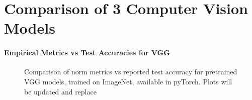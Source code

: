 \section{Comparison of 3 Computer Vision Models}
\label{sxn:cv}

\paragraph{Empirical Metrics vs Test Accuracies for VGG}

\begin{figure}[t]
    \centering
    \qquad
    \qquad
    \qquad
    \caption{Comparison of norm metrics vs reported test accuracy for pretrained VGG models, trained on ImageNet, available in pyTorch.  Plots will be updated and replace }
    

    \label{fig:vgg-metrics}
\end{figure}


